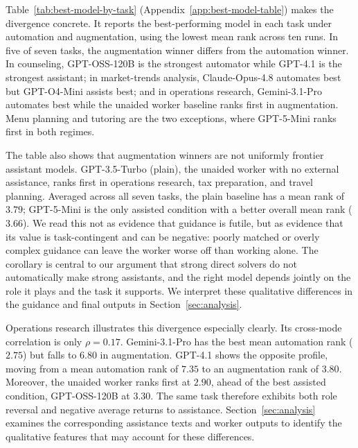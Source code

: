 Table~\ref{tab:best-model-by-task} (Appendix~\ref{app:best-model-table}) makes the divergence concrete. It reports the best-performing model in each task under automation and augmentation, using the lowest mean rank across ten runs. In five of seven tasks, the augmentation winner differs from the automation winner. In counseling, GPT-OSS-120B is the strongest automator while GPT-4.1 is the strongest assistant; in market-trends analysis, Claude-Opus-4.8 automates best but GPT-O4-Mini assists best; and in operations research, Gemini-3.1-Pro automates best while the unaided worker baseline ranks first in augmentation. Menu planning and tutoring are the two exceptions, where GPT-5-Mini ranks first in both regimes.

The table also shows that augmentation winners are not uniformly frontier
assistant models. GPT-3.5-Turbo (plain), the unaided worker with no external
assistance, ranks first in operations research, tax preparation, and travel
planning. Averaged across all seven tasks, the plain baseline has a mean rank
of $3.79$; GPT-5-Mini is the only assisted condition with a better overall mean
rank ($3.66$). We read this not as evidence that guidance is futile, but as
evidence that its value is task-contingent and can be negative: poorly matched
or overly complex guidance can leave the worker worse off than working alone.
The corollary is central to our argument that strong direct solvers do not
automatically make strong assistants, and the right model depends jointly on
the role it plays and the task it supports. We interpret these qualitative
differences in the guidance and final outputs in
Section~\ref{sec:analysis}.

Operations research illustrates this divergence especially clearly. Its
cross-mode correlation is only $\rho=0.17$. Gemini-3.1-Pro has the best mean
automation rank ($2.75$) but falls to $6.80$ in augmentation. GPT-4.1 shows
the opposite profile, moving from a mean automation rank of $7.35$ to an
augmentation rank of $3.80$. Moreover, the unaided worker ranks first at
$2.90$, ahead of the best assisted condition, GPT-OSS-120B at $3.30$. The
same task therefore exhibits both role reversal and negative average returns
to assistance. Section~\ref{sec:analysis} examines the corresponding
assistance texts and worker outputs to identify the qualitative features that
may account for these differences.
